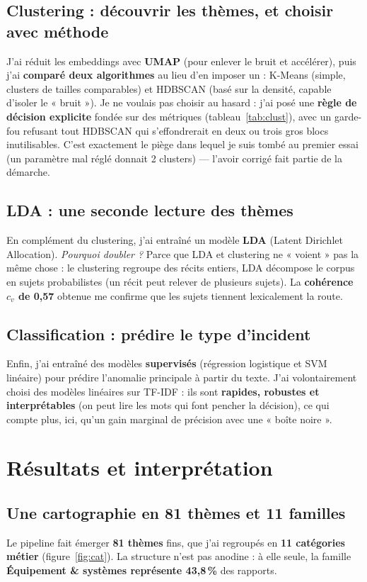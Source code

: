 \documentclass[11pt,a4paper]{article}
\begin{document}
\subsection{Clustering : découvrir les thèmes, et choisir avec méthode}
J'ai réduit les embeddings avec \textbf{UMAP} (pour enlever le bruit et accélérer), puis
j'ai \textbf{comparé deux algorithmes} au lieu d'en imposer un : K-Means (simple, clusters
de tailles comparables) et HDBSCAN (basé sur la densité, capable d'isoler le « bruit »).
Je ne voulais pas choisir au hasard : j'ai posé une \textbf{règle de décision explicite}
fondée sur des métriques (tableau~\ref{tab:clust}), avec un garde-fou refusant tout
HDBSCAN qui s'effondrerait en deux ou trois gros blocs inutilisables. C'est exactement le
piège dans lequel je suis tombé au premier essai (un paramètre mal réglé donnait 2 clusters)
— l'avoir corrigé fait partie de la démarche.

\subsection{LDA : une seconde lecture des thèmes}
En complément du clustering, j'ai entraîné un modèle \textbf{LDA} (Latent Dirichlet
Allocation). \emph{Pourquoi doubler ?} Parce que LDA et clustering ne « voient » pas la
même chose : le clustering regroupe des récits entiers, LDA décompose le corpus en sujets
probabilistes (un récit peut relever de plusieurs sujets). La \textbf{cohérence $c_v$ de
0,57} obtenue me confirme que les sujets tiennent lexicalement la route.

\subsection{Classification : prédire le type d'incident}
Enfin, j'ai entraîné des modèles \textbf{supervisés} (régression logistique et SVM
linéaire) pour prédire l'anomalie principale à partir du texte. J'ai volontairement choisi
des modèles linéaires sur TF-IDF : ils sont \textbf{rapides, robustes et interprétables}
(on peut lire les mots qui font pencher la décision), ce qui compte plus, ici, qu'un
gain marginal de précision avec une « boîte noire ».

\section{Résultats et interprétation}

\subsection{Une cartographie en 81 thèmes et 11 familles}
Le pipeline fait émerger \textbf{81 thèmes} fins, que j'ai regroupés en \textbf{11 catégories
métier} (figure~\ref{fig:cat}). La structure n'est pas anodine : à elle seule, la famille
\textbf{Équipement \& systèmes représente 43,8\,\%} des rapports.
\end{document}
